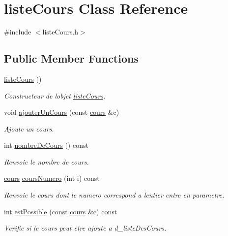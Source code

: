 \hypertarget{classliste_cours}{}\section{liste\+Cours Class Reference}
\label{classliste_cours}


{\ttfamily \#include $<$liste\+Cours.\+h$>$}

\subsection*{Public Member Functions}
\begin{DoxyCompactItemize}
\item 
\hyperlink{classliste_cours_af5a10a6e898373e43355b8a29dc20b83}{liste\+Cours} ()
\begin{DoxyCompactList}\small\item\em Constructeur de l\textquotesingle{}objet \hyperlink{classliste_cours}{liste\+Cours}. \end{DoxyCompactList}\item 
void \hyperlink{classliste_cours_aacc38305cfea76d8cc77d710d144ce8b}{ajouter\+Un\+Cours} (const \hyperlink{classcours}{cours} \&c)
\begin{DoxyCompactList}\small\item\em Ajoute un cours. \end{DoxyCompactList}\item 
int \hyperlink{classliste_cours_a34b859c2380770eb560c0a6dcf01cc81}{nombre\+De\+Cours} () const
\begin{DoxyCompactList}\small\item\em Renvoie le nombre de cours. \end{DoxyCompactList}\item 
\hyperlink{classcours}{cours} \hyperlink{classliste_cours_ac00615f15632669bf44424e960c95edd}{cours\+Numero} (int i) const
\begin{DoxyCompactList}\small\item\em Renvoie le cours dont le numero correspond a l\textquotesingle{}entier entre en parametre. \end{DoxyCompactList}\item 
int \hyperlink{classliste_cours_a788e1017848b813a450a6156dd043a7a}{est\+Possible} (const \hyperlink{classcours}{cours} \&c) const
\begin{DoxyCompactList}\small\item\em Verifie si le cours peut etre ajoute a d\+\_\+liste\+Des\+Cours. \end{DoxyCompactList}\item 

\end{DoxyCompactItemize}
